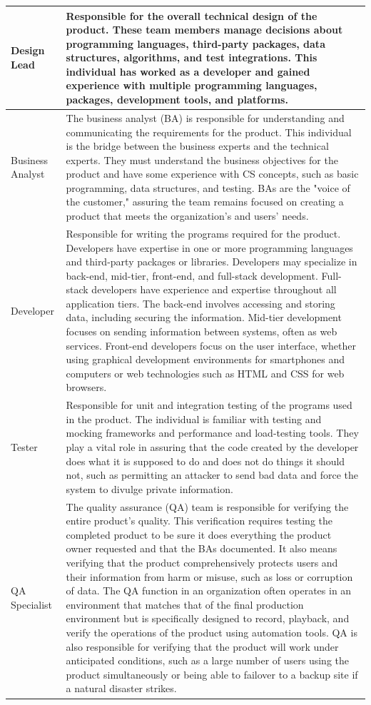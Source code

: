 \begin{longtable}[H]{p{.8in}|p{3.6in}}
	\hline
	\Tstrut Design Lead & Responsible for the overall technical design of the product. These team members manage decisions about programming languages, third-party packages, data structures, algorithms, and test integrations. This individual has worked as a developer and gained experience with multiple programming languages, packages, development tools, and platforms.\\
	\hline
	\Tstrut Business Analyst & The business analyst (BA) is responsible for understanding and communicating the requirements for the product. This individual is the bridge between the business experts and the technical experts. They must understand the business objectives for the product and have some experience with CS concepts, such as basic programming, data structures, and testing. BAs are the "voice of the customer," assuring the team remains focused on creating a product that meets the organization's and users' needs.\\
	\hline
	\Tstrut Developer & Responsible for writing the programs required for the product. Developers have expertise in one or more programming languages and third-party packages or libraries. Developers may specialize in back-end, mid-tier, front-end, and full-stack development. Full-stack developers have experience and expertise throughout all application tiers. The back-end involves accessing and storing data, including securing the information. Mid-tier development focuses on sending information between systems, often as web services. Front-end developers focus on the user interface, whether using graphical development environments for smartphones and computers or web technologies such as HTML and CSS for web browsers.\\
	\hline
	\Tstrut Tester & Responsible for unit and integration testing of the programs used in the product. The individual is familiar with testing and mocking frameworks and performance and load-testing tools. They play a vital role in assuring that the code created by the developer does what it is supposed to do and does not do things it should not, such as permitting an attacker to send bad data and force the system to divulge private information.\\
	\hline
	\Tstrut QA \linebreak Specialist & The quality assurance (QA) team is responsible for verifying the entire product's quality. This verification requires testing the completed product to be sure it does everything the product owner requested and that the BAs documented. It also means verifying that the product comprehensively protects users and their information from harm or misuse, such as loss or corruption of data. The QA function in an organization often operates in an environment that matches that of the final production environment but is specifically designed to record, playback, and verify the operations of the product using automation tools. QA is also responsible for verifying that the product will work under anticipated conditions, such as a large number of users using the product simultaneously or being able to failover to a backup site if a natural disaster strikes.\\

\end{longtable}
